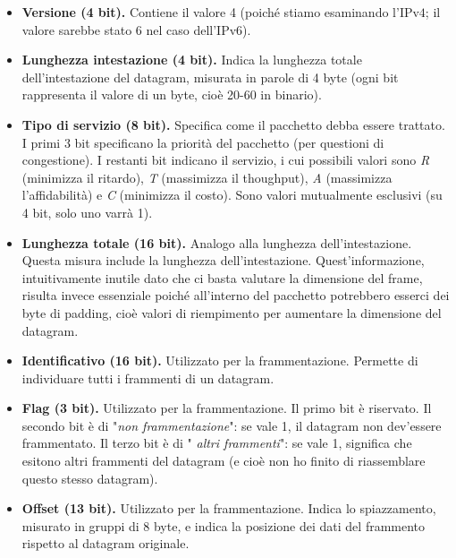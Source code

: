     \begin{itemize}
        \item 
            \textbf{Versione (4 bit).} Contiene il valore 4 (poiché stiamo esaminando l'IPv$4$; il valore sarebbe stato 6 nel caso dell'IPv$6$).
            
        \item 
            \textbf{Lunghezza intestazione (4 bit).} Indica la lunghezza totale dell'intestazione del datagram, misurata in parole di 4 byte (ogni bit rappresenta il valore di un byte, cioè 20-60 in binario).
            
        \item 
            \textbf{Tipo di servizio (8 bit).} Specifica come il pacchetto debba essere trattato. I primi 3 bit specificano la priorità del pacchetto (per questioni di congestione). I restanti bit indicano il servizio, i cui possibili valori sono \textit{R} (minimizza il ritardo), \textit{T} (massimizza il thoughput), \textit{A} (massimizza l'affidabilità) e \textit{C} (minimizza il costo). Sono valori mutualmente esclusivi (su 4 bit, solo uno varrà 1).
            
        \item 
            \textbf{Lunghezza totale (16 bit).} Analogo alla lunghezza dell'intestazione. Questa misura include la lunghezza dell'intestazione. Quest'informazione, intuitivamente inutile dato che ci basta valutare la dimensione del frame, risulta invece essenziale poiché all'interno del pacchetto potrebbero esserci dei byte di padding, cioè valori di riempimento per aumentare la dimensione del datagram. 
            
        \item 
            \textbf{Identificativo (16 bit).} Utilizzato per la frammentazione. Permette di individuare tutti i frammenti di un datagram.
            
        \item 
            \textbf{Flag (3 bit).} Utilizzato per la frammentazione. Il primo bit è riservato. Il secondo bit è di "\textit{non frammentazione}": se vale 1, il datagram non dev'essere frammentato. Il terzo bit è di "\textit{
altri frammenti}": se vale 1, significa che esitono altri frammenti del datagram (e cioè non ho finito di riassemblare questo stesso datagram).
            
        \item 
            \textbf{Offset (13 bit).} Utilizzato per la frammentazione. Indica lo spiazzamento, misurato in gruppi di 8 byte, e indica la posizione dei dati del frammento rispetto al datagram originale.
            

\end{itemize}
